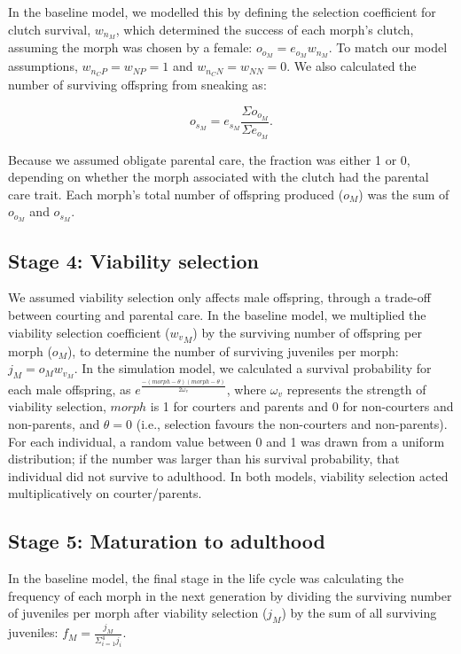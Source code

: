 \documentclass[
  11pt,
  a4paper,
]{article}
\begin{document}
In the baseline model, we modelled this by defining the selection
coefficient for clutch survival, \(w_{n_M}\), which determined the success
of each morph's clutch, assuming the morph was chosen by a female:
\(o_{o_M} = e_{o_M} w_{n_M}\). To match our model assumptions,
\(w_{n_CP} = w_{NP} = 1\) and \(w_{n_CN} = w_{NN} = 0\). We also calculated
the number of surviving offspring from sneaking as:

\[
o_{s_M} = e_{s_M} \frac{\Sigma{o_{o_M}}}{\Sigma{e_{o_M}}}.
\]

Because we assumed obligate parental care, the fraction was either 1 or
0, depending on whether the morph associated with the clutch had the
parental care trait. Each morph's total number of offspring produced
(\(o_M\)) was the sum of \(o_{o_M}\) and \(o_{s_M}\).

\hypertarget{stage-4-viability-selection}{%
\subsection{Stage 4: Viability selection}\label{stage-4-viability-selection}}

We assumed viability selection only affects male offspring, through a
trade-off between courting and parental care. In the baseline model, we
multiplied the viability selection coefficient (\({w_v}_M\)) by the
surviving number of offspring per morph (\(o_M\)), to determine the number
of surviving juveniles per morph: \(j_M = o_M w_{v_M}\). In the simulation
model, we calculated a survival probability for each male offspring, as
\(e^{\frac{-(morph - \theta)(morph - \theta)}{2\omega_v}}\), where
\(\omega_v\) represents the strength of viability selection, \(morph\) is 1
for courters and parents and 0 for non-courters and non-parents, and
\(\theta = 0\) (i.e., selection favours the non-courters and non-parents).
For each individual, a random value between 0 and 1 was drawn from a
uniform distribution; if the number was larger than his survival
probability, that individual did not survive to adulthood. In both
models, viability selection acted multiplicatively on courter/parents.

\hypertarget{stage-5-maturation-to-adulthood}{%
\subsection{Stage 5: Maturation to adulthood}\label{stage-5-maturation-to-adulthood}}

In the baseline model, the final stage in the life cycle was calculating
the frequency of each morph in the next generation by dividing the
surviving number of juveniles per morph after viability selection
(\(j_M\)) by the sum of all surviving juveniles:
\(f_M = \frac{j_M}{\Sigma_{i=1}^4{j_i}}\).
\end{document}

